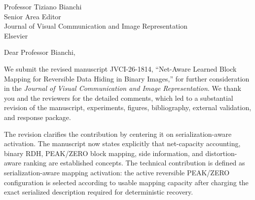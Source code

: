 \documentclass[11pt,a4paper]{letter}
\begin{document}
\begin{letter}{Professor Tiziano Bianchi\\Senior Area Editor\\Journal of Visual Communication and Image Representation\\Elsevier}

\opening{Dear Professor Bianchi,}

We submit the revised manuscript JVCI-26-1814, ``Net-Aware Learned Block Mapping for Reversible Data Hiding in Binary Images,'' for further consideration in the \emph{Journal of Visual Communication and Image Representation}. We thank you and the reviewers for the detailed comments, which led to a substantial revision of the manuscript, experiments, figures, bibliography, external validation, and response package.

The revision clarifies the contribution by centering it on serialization-aware activation. The manuscript now states explicitly that net-capacity accounting, binary RDH, PEAK/ZERO block mapping, side information, and distortion-aware ranking are established concepts. The technical contribution is defined as serialization-aware mapping activation: the active reversible PEAK/ZERO configuration is selected according to usable mapping capacity after charging the exact serialized description required for deterministic recovery.


\end{letter}
\end{document}
